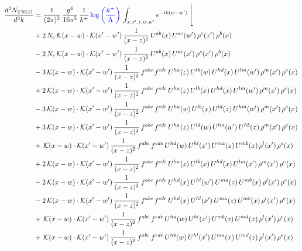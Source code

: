 \documentclass[9pt]{article}
\numberwithin{equation}{section}
\begin{document}
\begin{align}
\frac{d^{3}N_{2\,\mathrm{NLO}}}{d^{3}k} & = \frac{1}{(2\pi)^{3}}\,\frac{g^{4}}{16\pi^{5}}\,\frac{1}{k^{+}}\,{\color{blue}\log{\left(\frac{k^{+}}{\Lambda}\right)}}\,\int_{x,x',z,w,w'}e^{-ik(w-w')}\,\Bigg[
\notag\\ &+2\,N_{c}\,\mathcal{K}(x-w)\cdot\mathcal{K}(x'-w')\,\frac{1}{(x-z)^{2}}\,U^{ab}(x)\,U^{ac}(w')\,\rho^{c}(x')\,\rho^{b}(x)\notag\\
&-2\,N_{c}\,\mathcal{K}(x-w)\cdot\mathcal{K}(x'-w')\,\frac{1}{(x-z)^{2}}\,U^{ab}(x)\,U^{ac}(x')\,\rho^{c}(x')\,\rho^{b}(x)\notag\\
&-3\,\mathcal{K}(x-w)\cdot\mathcal{K}(x'-w')\,\frac{1}{(x-z)^{2}}\,f^{abc}\,f^{cde}\,U^{ha}(z)\,U^{lb}(w)\,U^{hd}(x)\,U^{lm}(w')\,\rho^{m}(x')\,\rho^{e}(x)\notag\\
&+2\,\mathcal{K}(x-w)\cdot\mathcal{K}(x'-w')\,\frac{1}{(x-z)^{2}}\,f^{abc}\,f^{cde}\,U^{ha}(z)\,U^{lb}(x)\,U^{hd}(x)\,U^{lm}(w')\,\rho^{m}(x')\,\rho^{e}(x)\notag\\
&-3\,\mathcal{K}(x-w)\cdot\mathcal{K}(x'-w')\,\frac{1}{(x-z)^{2}}\,f^{abc}\,f^{cde}\,U^{ha}(w)\,U^{lb}(x)\,U^{ld}(z)\,U^{hm}(w')\,\rho^{m}(x')\,\rho^{e}(x)\notag\\
&+3\,\mathcal{K}(x-w)\cdot\mathcal{K}(x'-w')\,\frac{1}{(x-z)^{2}}\,f^{abc}\,f^{cde}\,U^{ha}(z)\,U^{ld}(w)\,U^{lm}(w')\,U^{hb}(x)\,\rho^{m}(x')\,\rho^{e}(x)\notag\\
&+\,\mathcal{K}(x-w)\cdot\mathcal{K}(x'-w')\,\frac{1}{(x-z)^{2}}\,f^{abc}\,f^{cde}\,U^{hd}(w)\,U^{hl}(x')\,U^{ma}(z)\,U^{mb}(x)\,\rho^{l}(x')\,\rho^{e}(x)\notag\\
&+2\,\mathcal{K}(x-w)\cdot\mathcal{K}(x'-w')\,\frac{1}{(x-z)^{2}}\,f^{abc}\,f^{cde}\,U^{ha}(z)\,U^{lb}(x)\,U^{hd}(x)\,U^{lm}(x')\,\rho^{m}(x')\,\rho^{e}(x)\notag\\
&-2\,\mathcal{K}(x-w)\cdot\mathcal{K}(x'-w')\,\frac{1}{(x-z)^{2}}\,f^{abc}\,f^{cde}\,U^{hd}(x)\,U^{hl}(w')\,U^{ma}(z)\,U^{mb}(x)\,\rho^{l}(x')\,\rho^{e}(x)\notag\\
&-2\,\mathcal{K}(x-w)\cdot\mathcal{K}(x'-w')\,\frac{1}{(x-z)^{2}}\,f^{abc}\,f^{cde}\,U^{hd}(x)\,U^{hl}(x')\,U^{ma}(z)\,U^{mb}(x)\,\rho^{l}(x')\,\rho^{e}(x)\notag\\
&+\,\mathcal{K}(x-w)\cdot\mathcal{K}(x'-w')\,\frac{1}{(x-z)^{2}}\,f^{abc}\,f^{cde}\,U^{ha}(w)\,U^{hl}(x')\,U^{mb}(z)\,U^{md}(x)\,\rho^{l}(x')\,\rho^{e}(x)\notag\\
&+\,\mathcal{K}(x-w)\cdot\mathcal{K}(x'-w')\,\frac{1}{(x-z)^{2}}\,f^{abc}\,f^{cde}\,U^{hb}(w)\,U^{hl}(x')\,U^{ma}(x)\,U^{md}(z)\,\rho^{l}(x')\,\rho^{e}(x)\notag\\

\end{align}
\end{document}
